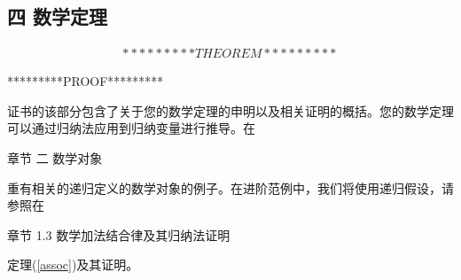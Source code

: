 \documentclass[twocolumn]{article}
\begin{document}
\begin{CJK}{UTF8}{gbsn}
\section*{四 数学定理}
\label{theorem}

\begin{eqnarray*}
*********THEOREM*********
\end{eqnarray*}
\begin{center}
*********PROOF*********
\end{center}

\indent \indent 证书的该部分包含了关于您的数学定理的申明以及相关证明的概括。您的数学定理可以通过归纳法应用到归纳变量进行推导。在\begin{CJK}{UTF8}{gkai}章节 二 数学对象\end{CJK}重有相关的递归定义的数学对象的例子。在进阶范例中，我们将使用递归假设，请参照在\begin{CJK}{UTF8}{gkai}章节 1.3 数学加法结合律及其归纳法证明\end{CJK}定理(\ref{assoc})及其证明。


\end{CJK}
\end{document}
